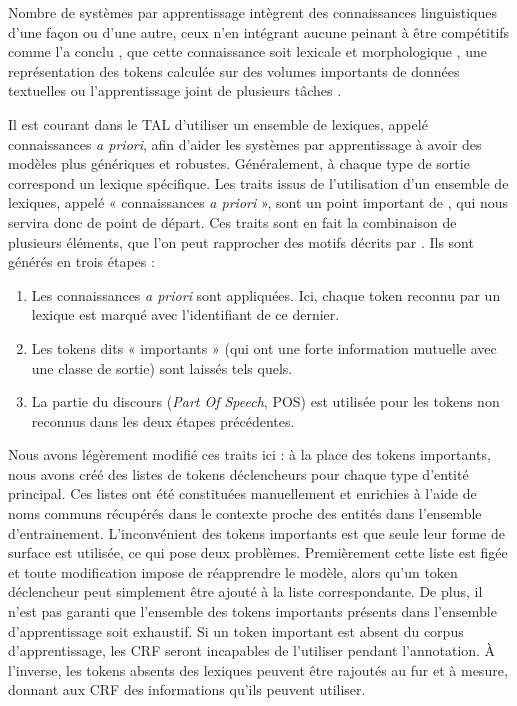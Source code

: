 \documentclass[PhD-Yoann-Dupont.tex]{subfiles}
\begin{document}
Nombre de systèmes par apprentissage intègrent des connaissances linguistiques d'une façon ou d'une autre, ceux n'en intégrant aucune peinant à être compétitifs comme l'a conclu \citet{jungermann2007named}, que cette connaissance soit lexicale et morphologique \citep{raymond2010reconnaissance,constant2011integrer,holat2016fouille}, une représentation des tokens calculée sur des volumes importants de données textuelles \citep{collobert2008unified,ratinov2009design,lample2016neural} ou l'apprentissage joint de plusieurs tâches \citep{collobert2008unified,luo2015joint}.

Il est courant dans le TAL d'utiliser un ensemble de lexiques, appelé connaissances \emph{a priori}, afin d'aider les systèmes par apprentissage à avoir des modèles plus génériques et robustes. Généralement, à chaque type de sortie correspond un lexique spécifique. Les traits issus de l'utilisation d'un ensemble de lexiques, appelé « connaissances \emph{a priori} », sont un point important de \citet{raymond2010reconnaissance}, qui nous servira donc de point de départ. Ces traits sont en fait la combinaison de plusieurs éléments, que l'on peut rapprocher des motifs décrits par \citet{holat2016fouille}. Ils sont générés en trois étapes :
\begin{enumerate}
    \item Les connaissances \emph{a priori} sont appliquées. Ici, chaque token reconnu par un lexique est marqué avec l'identifiant de ce dernier.
    \item Les tokens dits « importants » (qui ont une forte information mutuelle avec une classe de sortie) sont laissés tels quels.
    \item La partie du discours (\emph{Part Of Speech}, POS) est utilisée pour les tokens non reconnus dans les deux étapes précédentes.
\end{enumerate}

Nous avons légèrement modifié ces traits ici : à la place des tokens importants, nous avons créé des listes de tokens déclencheurs pour chaque type d'entité principal. Ces listes ont été constituées manuellement et enrichies à l'aide de noms communs récupérés dans le contexte proche des entités dans l'ensemble d'entrainement. L'inconvénient des tokens importants est que seule leur forme de surface est utilisée, ce qui pose deux problèmes. Premièrement cette liste est figée et toute modification impose de réapprendre le modèle, alors qu'un token déclencheur peut simplement être ajouté à la liste correspondante. De plus, il n'est pas garanti que l'ensemble des tokens importants présents dans l'ensemble d'apprentissage soit exhaustif. Si un token important est absent du corpus d'apprentissage, les CRF seront incapables de l'utiliser pendant l'annotation. À l'inverse, les tokens absents des lexiques peuvent être rajoutés au fur et à mesure, donnant aux CRF des informations qu'ils peuvent utiliser.
\end{document}
